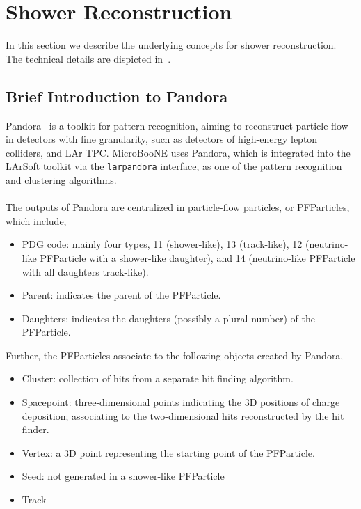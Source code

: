 \section{Shower Reconstruction}
\label{sec:reco}

In this section we describe the underlying concepts for shower reconstruction.
The technical details are dispicted in~\cite{DocDB5857}.\\

\subsection{Brief Introduction to Pandora}
\label{sec:pandora}

Pandora~\cite{DocDB5828} is a toolkit for pattern recognition, aiming to 
reconstruct particle flow in detectors with fine granularity, such as
detectors of high-energy lepton colliders, and LAr TPC.
MicroBooNE uses Pandora, which is integrated into the LArSoft toolkit
via the \texttt{larpandora} interface,
as one of the pattern recognition and clustering algorithms. \\
\\
The outputs of Pandora are centralized in particle-flow particles, 
or PFParticles, which include,
\begin{itemize}
\item PDG code: mainly four types, 11 (shower-like),
      13 (track-like), 12 (neutrino-like PFParticle with a shower-like
      daughter), and 14 (neutrino-like PFParticle with all daughters
      track-like).
\item Parent: indicates the parent of the PFParticle.
\item Daughters: indicates the daughters (possibly a plural number) of
      the PFParticle.
\end{itemize}
Further, the PFParticles associate to the following objects created
by Pandora,
\begin{itemize}
\item Cluster: collection of hits from a separate hit finding algorithm.
\item Spacepoint: three-dimensional points indicating the 3D positions
      of charge deposition; associating to the two-dimensional hits
      reconstructed by the hit finder.
\item Vertex: a 3D point representing the starting point of the PFParticle.
\item Seed: not generated in a shower-like PFParticle
\item Track
\end{itemize}

